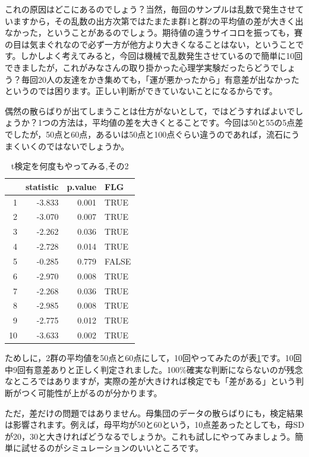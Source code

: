 \documentclass{ltjsarticle}
\begin{document}
これの原因はどこにあるのでしょう？当然，毎回のサンプルは乱数で発生させていますから，その乱数の出方次第ではたまたま群1と群2の平均値の差が大きく出なかった，ということがあるのでしょう。期待値の違うサイコロを振っても，賽の目は気まぐれなので必ず一方が他方より大きくなることはない，ということです。しかしよく考えてみると，今回は機械で乱数発生させているので簡単に10回できましたが，これがみなさんの取り掛かった心理学実験だったらどうでしょう？毎回20人の友達をかき集めても，「運が悪かったから」有意差が出なかったというのでは困ります。正しい判断ができていないことになるからです。

偶然の散らばりが出てしまうことは仕方がないとして，ではどうすればよいでしょうか？1つの方法は，平均値の差を大きくとることです。今回は50と55の5点差でしたが，50点と60点，あるいは50点と100点ぐらい違うのであれば，流石にうまくいくのではないでしょうか。


\begin{table}[ht]
    \centering
    \caption{t検定を何度もやってみる,その2} 
    \begin{tabular}{rrrl}
      \hline
     & statistic & p.value & FLG \\ 
      \hline
    1 & -3.833 & 0.001 & TRUE \\ 
      2 & -3.070 & 0.007 & TRUE \\ 
      3 & -2.262 & 0.036 & TRUE \\ 
      4 & -2.728 & 0.014 & TRUE \\ 
      5 & -0.285 & 0.779 & FALSE \\ 
      6 & -2.970 & 0.008 & TRUE \\ 
      7 & -2.268 & 0.036 & TRUE \\ 
      8 & -2.985 & 0.008 & TRUE \\ 
      9 & -2.775 & 0.012 & TRUE \\ 
      10 & -3.633 & 0.002 & TRUE \\ 
       \hline
    \end{tabular}
    \label{tbl::19_04}
    \end{table}

ためしに，2群の平均値を50点と60点にして，10回やってみたのが表\ref{tbl::19_04}です。10回中9回有意差ありと正しく判定されました。100\%確実な判断にならないのが残念なところではありますが，実際の差が大きければ検定でも「差がある」という判断がつく可能性が上がるのが分かります。

ただ，差だけの問題ではありません。母集団のデータの散らばりにも，検定結果は影響されます。例えば，母平均が50と60という，10点差あったとしても，母SDが20，30と大きければどうなるでしょうか。これも試しにやってみましょう。簡単に試せるのがシミュレーションのいいところです。
\end{document}
